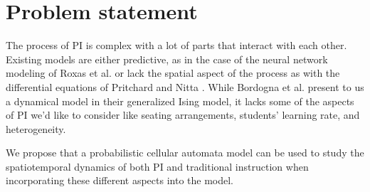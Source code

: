 \section{Problem statement}
The process of PI is complex with a lot of parts that interact with each other.
Existing models are either predictive, as in the case of the neural network modeling of Roxas et al. \cite{roxas2010seating} or lack the spatial aspect of the process as with the differential equations of Pritchard \cite{pritchard2008mathematical} and Nitta \cite{nitta2019mathematical}.
While Bordogna et al. \cite{bordogna2001theoretical,bordogna2003simulation} present to us a dynamical model in their generalized Ising model, it lacks some of the aspects of PI we'd like to consider like seating arrangements, students' learning rate, and heterogeneity.

We propose that a probabilistic cellular automata model can be used to study the spatiotemporal dynamics of both PI and traditional instruction when incorporating these different aspects into the model.
